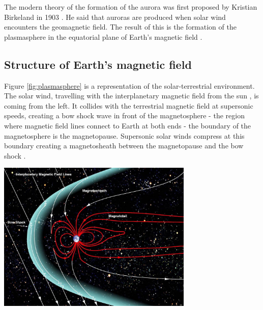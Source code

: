 \documentclass{article}
\newenvironment{Figure}
  {\par\medskip\noindent\minipage{\linewidth}}
  {\endminipage\par\medskip}
\begin{document}
The modern theory of the formation of the aurora was first proposed by Kristian Birkeland in 1903 \cite{birkeland2018norwegian}. He said that auroras are produced when solar wind encounters the geomagnetic field. The result of this is the formation of the plasmasphere in the equatorial plane of Earth's magnetic field \cite{cosmicelectrodyn}.

\subsection{Structure of Earth's magnetic field}
Figure \ref{fig:plasmasphere} is a representation of the solar-terrestrial environment. The solar wind, travelling with the interplanetary magnetic field from the sun \cite{Svalgaard_2010}, is coming from the left. It collides with the terrestrial magnetic field at supersonic speeds, creating a bow shock wave in front of the magnetosphere - the region where magnetic field lines connect to Earth at both ends - the boundary of the magnetosphere is the magnetopause. Supersonic solar winds compress at this boundary creating a magnetosheath between the magnetopause and the bow shock \cite{BSPP}.

\begin{Figure}
    \begin{minipage}[c]{0.57\textwidth}
        \centering
        \includegraphics[width=0.7\textwidth]{NASA-Magnetosphere.jpeg}
    \end{minipage}\hfill
    \begin{minipage}[c]{0.4\textwidth}
        \label{fig:plasmasphere}
    \end{minipage}
\end{Figure}
\end{document}
